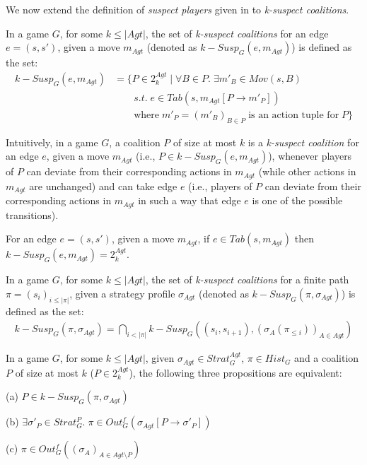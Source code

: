 We now extend the definition of \textit{suspect players} given in \cite{BBM-concur10,BBM-report,BBMU-fsttcs11,Romain-phd} to \textit{k-suspect coalitions}.

\begin{definition}
In a game $G$, for some $k \leq \vert Agt \vert$, the set of \textit{k-suspect coalitions} for an edge $e = (s, s')$, given a move $m_{Agt}$ (denoted as $k-Susp_{G}(e, m_{Agt})$) is defined as the set:
\begin{align*}
k-Susp_{G}(e, m_{Agt}) &= \lbrace P \in 2^{Agt}_{k} \; \vert \; \forall B \in P. \; \exists m'_{B} \in Mov(s, B) \\
&\qquad s.t. \; e \in Tab(s, m_{Agt}[P \rightarrow m'_{P}])\\
&\qquad \text{where} \; m'_{P} = (m'_{B})_{B\in P} \; \text{is an action tuple for} \; P \rbrace
\end{align*}
\end{definition}

Intuitively, in a game $G$, a coalition $P$ of size at most $k$ is a \textit{k-suspect coalition} for an edge $e$, given a move $m_{Agt}$ (i.e., $P \in k-Susp_{G}(e, m_{Agt})$), whenever players of $P$ can deviate from their corresponding actions in $m_{Agt}$ (while other actions in $m_{Agt}$ are unchanged) and can take edge $e$ (i.e., players of $P$ can deviate from their corresponding actions in $m_{Agt}$ in such a way that edge $e$ is one of the possible transitions).

\begin{remark}
For an edge $e = (s, s')$, given a move $m_{Agt}$, if $e \in Tab(s, m_{Agt})$ then $k-Susp_{G}(e, m_{Agt}) = 2^{Agt}_{k}$.
\end{remark}

\begin{definition}
In a game $G$, for some $k \leq \vert Agt \vert$, the set of \textit{k-suspect coalitions} for a finite path $\pi = (s_{i})_{i \leq \vert \pi \vert}$, given a strategy profile $\sigma_{Agt}$ (denoted as $k-Susp_{G}(\pi, \sigma_{Agt})$) is defined as the set:
\begin{align*}
k-Susp_{G}(\pi, \sigma_{Agt}) = \bigcap \limits_{i<\vert \pi \vert} k-Susp_{G}((s_{i}, s_{i+1}), (\sigma_{A}(\pi_{\leq i}))_{A\in Agt})
\end{align*}
\end{definition}

\begin{lemma}
\label{lemma1}
In a game $G$, for some $k \leq \vert Agt \vert$, given $\sigma_{Agt} \in Strat^{Agt}_{G}$, $\pi \in Hist_{G}$ and a coalition $P$ of size at most $k$ ($P \in 2^{Agt}_{k}$), the following three propositions are equivalent:

(a) $P \in k-Susp_{G}(\pi, \sigma_{Agt})$

(b) $\exists \sigma'_{P} \in Strat^{P}_{G}. \; \pi \in Out_{G}^{f}(\sigma_{Agt}[P \rightarrow \sigma'_{P}])$

(c) $\pi \in Out_{G}^{f}((\sigma_{A})_{A\in Agt\setminus P})$
\end{lemma}

